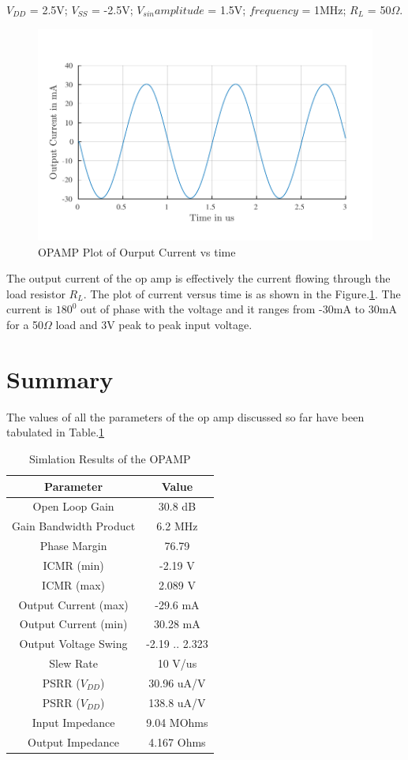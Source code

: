 $V_{DD}$ = 2.5V; $V_{SS}$ = -2.5V; $V_{sin} amplitude $ = 1.5V; $frequency$ = 1MHz; $R_L$ = 50$\Omega$.
\begin{figure} [H]
\centering
\includegraphics[scale=1]{Figures/Plots/OPAMP_Iout.pdf}
\caption{OPAMP Plot of Ourput Current vs time}
\label{fig:OPAMP_Iout}
\end{figure}
The output current of the op amp is effectively the current flowing through the load resistor $R_L$. The plot of current versus time is as shown in the Figure.\ref{fig:OPAMP_Iout}. The current is $180^0$ out of phase with the voltage and it ranges from -30mA to 30mA for a 50$\Omega$ load and 3V peak to peak input voltage. 

\section{Summary}

The values of all the parameters of the op amp discussed so far have been tabulated in Table.\ref{tab:OPAMP_Results}
\begin{table} [H]
\centering
\begin{tabular}{@{}cc@{}}
\toprule
Parameter					& Value				\\ \midrule
Open Loop Gain				& 30.8 dB			\\
Gain Bandwidth Product		& 6.2 MHz			\\
Phase Margin				& 76.79				\\
ICMR (min)					& -2.19 V			\\
ICMR (max)					& 2.089 V			\\
Output Current (max)		& -29.6 mA			\\
Output Current (min)		& 30.28 mA			\\
Output Voltage Swing		& -2.19 .. 2.323 	\\
Slew Rate					& 10 V/us			\\
PSRR ($V_{DD}$)				& 30.96 uA/V		\\
PSRR ($V_{DD}$)				& 138.8 uA/V		\\
Input Impedance				& 9.04 MOhms		\\
Output Impedance			& 4.167 Ohms		\\
\bottomrule
\end{tabular}
\caption{Simlation Results of the OPAMP}
\label{tab:OPAMP_Results}
\end{table}


